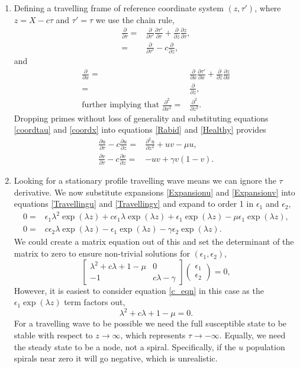 \documentclass[10pt]{article}
\newcommand{\bb}{\begin{equation}}
\newcommand{\ee}{\end{equation}}
\newcommand{\D}[2]{\frac{\partial #1}{\partial #2}}
\newcommand{\DD}[2]{\frac{\partial^2 #1}{\partial #2^2}}
\newcommand{\eqn}[1]{equation \eqref{#1}}
\newcommand{\eqns}[2]{equations \eqref{#1} and \eqref{#2}}
\renewcommand{\l}{\left(}
\renewcommand{\r}{\right)}
\begin{document}
\begin{Answ}
\begin{enumerate}
 \item Defining a travelling frame of reference coordinate system $(z,\tau')$, where $z=X-c\tau$ and $\tau'=\tau$ we use the chain rule,
 \begin{align}
 \D{}{\tau}=&\D{}{\tau'}\D{\tau'}{\tau}+\D{}{z}\D{z}{\tau},\nonumber\\
 =&\D{}{\tau'}-c\D{}{z},\label{coordtau}
 \end{align}
and
 \begin{align}
 \D{}{x}=&\D{}{x}\D{\tau'}{x}+\D{}{z}\D{z}{x}\nonumber\\
 =&\D{}{z},\nonumber\\
\textrm{further implying that } \DD{}{x}=&\DD{}{z}.\label{coordx}
 \end{align}
 Dropping primes without loss of generality and substituting \eqns{coordtau}{coordx} into \eqns{Rabid}{Healthy} provides
\begin{align}
\D{u}{\tau}-c\D{u}{z}=&\DD{u}{z}+uv-\mu u,\label{Travellingu}\\
\D{v}{\tau}-c\D{v}{z}=&-uv+\gamma v\l 1-v\r\label{Travellingv}.
\end{align}


\item Looking for a stationary profile travelling wave means we can ignore the $\tau$ derivative. We now substitute expansions \eqref{Expansionu} and \eqref{Expansionv} into \eqns{Travellingu}{Travellingv} and expand to order 1 in $\epsilon_1$ and $\epsilon_2$,
\begin{align}
0=&\epsilon_1\lambda^2\exp(\lambda z)+c\epsilon_1\lambda\exp(\lambda z)+\epsilon_1\exp(\lambda z)-\mu \epsilon_1\exp(\lambda z),\label{c_eqn}\\
0=&c\epsilon_2\lambda\exp(\lambda z)-\epsilon_1\exp(\lambda z)-\gamma \epsilon_2\exp(\lambda z).
\end{align}
We could create a matrix equation out of this and set the determinant of the matrix to zero to ensure non-trivial solutions for $(\epsilon_1,\epsilon_2)$,
\bb
\left[ \begin{array}{cc}\lambda^2+c\lambda +1-\mu &0\\
-1&c\lambda-\gamma
\end {array} \right]\l \begin{array}{c}\epsilon_1\\
\epsilon_2
\end {array} \r=0,
\ee
However, it is easiest to consider \eqn{c_eqn} in this case as the $\epsilon_1 \exp(\lambda z)$ term factors out,
\bb
\lambda^2+c\lambda +1-\mu=0.\label{lambda}
\ee
For a travelling wave to be possible we need the full susceptible state to be stable with respect to $z\rightarrow \infty$, which represents  $\tau \rightarrow-\infty$. Equally, we need the steady state to be a node, not a spiral. Specifically, if the $u$ population spirals near zero it will go negative, which is unrealistic.


\end{enumerate}
\end{Answ}
\end{document}
